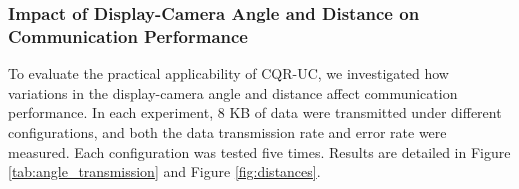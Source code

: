 \documentclass[preprint,12pt]{elsarticle}
\begin{document}
\subsubsection{Impact of Display-Camera Angle and Distance on Communication Performance}

To evaluate the practical applicability of CQR-UC, we investigated how variations in the display-camera angle and distance affect communication performance. In each experiment, 8 KB of data were transmitted under different configurations, and both the data transmission rate and error rate were measured. Each configuration was tested five times. Results are detailed in Figure \ref{tab:angle_transmission} and Figure \ref{fig:distances}.
\end{document}
